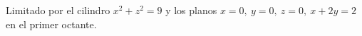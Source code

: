 \item Limitado por el cilindro $x^2 + z^2 = 9$ y los planos $x = 0, \ y = 0, \ z = 0, \ x + 2y = 2$ en el primer octante.
